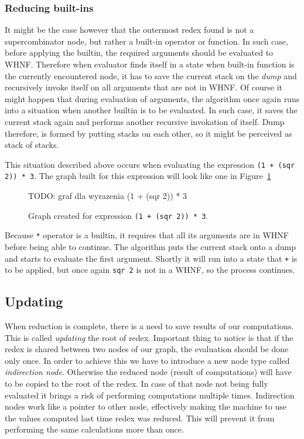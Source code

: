 \documentclass[12pt,a4paper]{report}
\begin{document}
\subsubsection{Reducing built-ins}
It might be the case however that the outermost redex found is not a
supercombinator node, but rather a built-in operator or function. In such case,
before applying the builtin, the required arguments should be evaluated to
WHNF. Therefore when evaluator finds itself in a state when built-in function
is the currently encountered node, it has to save the current stack on the
\textit{dump} and recursively invoke itself on all arguments that are not in
WHNF. Of course it might happen that during evaluation of arguments, the
algorithm once again runs into a situation when another builtin is to be
evaluated. In such case, it saves the current stack again and performs another
recursive invokation of itself. Dump therefore, is formed by putting stacks on
each other, so it might be perceived as stack of stacks.

This situation described above occurs when evaluating the expression \texttt{(1
+ (sqr 2)) * 3}. The graph built for this expression will look like one in
Figure~\ref{fig:expression_graph}

\begin{figure}[h!]
  \centering

  TODO: graf dla wyrazenia (1 + (sqr 2)) * 3

  \caption{Graph created for expression \texttt{(1 + (sqr 2)) * 3}.}
  \label{fig:expression_graph}
\end{figure}

Because \texttt{*} operator is a builtin, it requires that all its arguments
are in WHNF before being able to continue. The algorithm puts the current stack
onto a dump and starts to evaluate the first argument. Shortly it will run into
a state that \texttt{+} is to be applied, but once again \texttt{sqr 2} is not
in a WHNF, so the process continues.

\subsection{Updating}
\label{sec:updating}
When reduction is complete, there is a need to save results of our
computations. This is called \textit{updating} the root of redex. Important
thing to notice is that if the redex is shared between two nodes of our graph,
the evaluation should be done only once. In order to achieve this we have to
introduce a new node type called \textit{indirection node}. Otherwise the
reduced node (result of computations) will have to be copied to the root of
the redex. In case of that node not being fully evaluated it brings a risk of
performing computations multiple times. Indirection nodes work like a pointer
to other node, effectively making the machine to use the values computed last
time redex was reduced. This will prevent it from performing the same
calculations more than once.
\end{document}
